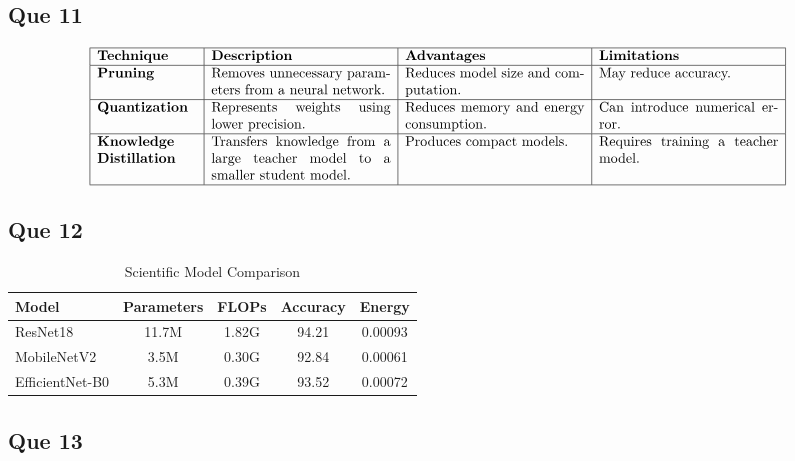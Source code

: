 \documentclass[12pt,a4paper]{article}
\begin{document}
	\subsection*{Que 11}
	\[
	\begin{array}{|p{2.5cm}|p{4.5cm}|p{4.5cm}|p{4.5cm}|}
		\hline
		\textbf{Technique} & \textbf{Description} & \textbf{Advantages} & \textbf{Limitations}\\
		\hline
		\textbf{Pruning} &
		Removes unnecessary parameters from a neural network. &
		Reduces model size and computation. &
		May reduce accuracy.\\
		\hline
		\textbf{Quantization} &
		Represents weights using lower precision. &
		Reduces memory and energy consumption. &
		Can introduce numerical error.\\
		\hline
		\textbf{Knowledge Distillation} &
		Transfers knowledge from a large teacher model to a smaller student model. &
		Produces compact models. &
		Requires training a teacher model.\\
		\hline
	\end{array}
	\]
	\subsection*{Que 12}
	
	\begin{table}[h]
		\centering
		\caption{Scientific Model Comparison}
		\label{tab:scientific-models}
		\begin{tabular}{lcccc}
			\toprule
			\textbf{Model} & \textbf{Parameters} & \textbf{FLOPs} &
			\textbf{Accuracy} & \textbf{Energy}\\
			\midrule
			ResNet18 & 11.7M & 1.82G & 94.21 & 0.00093\\
			MobileNetV2 & 3.5M & 0.30G & 92.84 & 0.00061\\
			EfficientNet-B0 & 5.3M & 0.39G & 93.52 & 0.00072\\
			\bottomrule
		\end{tabular}
	\end{table}
	
\subsection*{Que 13}
\end{document}
